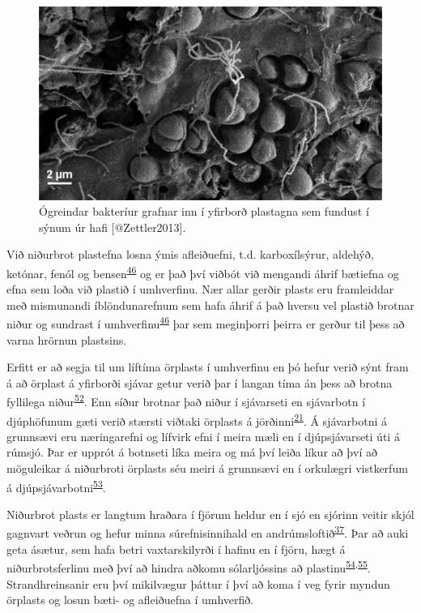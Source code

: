 \documentclass[icelandic,]{book}
\begin{document}
\begin{figure}

{\centering \includegraphics[width=0.8\linewidth]{myndir/Plast_pit} 

}

\caption{Ógreindar bakteríur grafnar inn í yfirborð plastagna sem fundust í sýnum úr hafi [@Zettler2013].}\label{fig:Plastpit}
\end{figure}

Við niðurbrot plastefna losna ýmis afleiðuefni, t.d. karboxílsýrur, aldehýð, ketónar, fenól og bensen\textsuperscript{\protect\hyperlink{ref-gewert2015pathways}{46}} og er það því viðbót við mengandi áhrif bætiefna og efna sem loða við plastið í umhverfinu.
Nær allar gerðir plasts eru framleiddar með mismunandi íblöndunarefnum sem hafa áhrif á það hversu vel plastið brotnar niður og sundrast í umhverfinu\textsuperscript{\protect\hyperlink{ref-gewert2015pathways}{46}} þar sem meginþorri þeirra er gerður til þess að varna hrörnun plastsins.

Erfitt er að segja til um líftíma örplasts í umhverfinu en þó hefur verið sýnt fram á að örplast á yfirborði sjávar getur verið þar í langan tíma án þess að brotna fyllilega niður\textsuperscript{\protect\hyperlink{ref-brandon2016long}{52}}. Enn síður brotnar það niður í sjávarseti en sjávarbotn í djúphöfunum gæti verið stærsti viðtaki örplasts á jörðinni\textsuperscript{\protect\hyperlink{ref-woodall2014deep}{21}}. Á sjávarbotni á grunnsævi eru næringarefni og lífvirk efni í meira mæli en í djúpsjávarseti úti á rúmsjó. Þar er upprót á botnseti líka meira og má því leiða líkur að því að möguleikar á niðurbroti örplasts séu meiri á grunnsævi en í orkulægri vistkerfum á djúpsjávarbotni\textsuperscript{\protect\hyperlink{ref-Nozari2016}{53}}.

Niðurbrot plasts er langtum hraðara í fjörum heldur en í sjó en sjórinn veitir skjól gagnvart veðrun og hefur minna súrefnisinnihald en andrúmsloftið\textsuperscript{\protect\hyperlink{ref-andrady2011microplastics}{37}}. Þar að auki geta ásætur, sem hafa betri vaxtarskilyrði í hafinu en í fjöru, hægt á niðurbrotsferlinu með því að hindra aðkomu sólarljóssins að plastinu\textsuperscript{\protect\hyperlink{ref-o2010degradation}{54},\protect\hyperlink{ref-muthukumar2011fouling}{55}}. Strandhreinsanir eru því mikilvægur þáttur í því að koma í veg fyrir myndun örplasts og losun bæti- og afleiðuefna í umhverfið.
\end{document}

